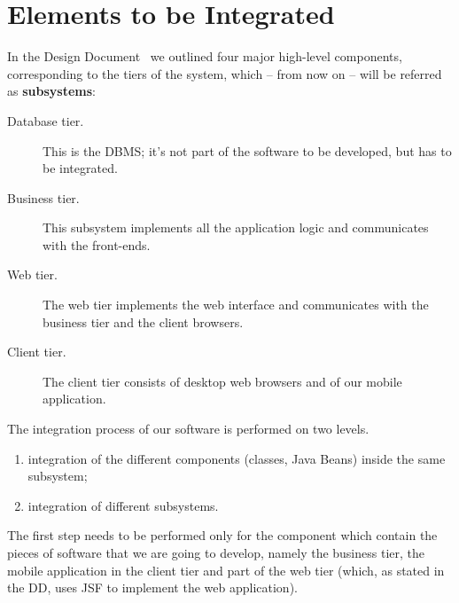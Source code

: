 \section{Elements to be Integrated}
\label{sec:elements}

In the Design Document~\cite[p.~6]{mytaxi-dd} we outlined four major high-level components, corresponding to the tiers of the system, which – from now on – will be referred as \textbf{subsystems}:
\begin{description}
    \item[Database tier.] This is the DBMS; it's not part of the software to be developed, but has to be integrated.
    \item[Business tier.] This subsystem implements all the application logic and communicates with the front-ends.
    \item[Web tier.] The web tier implements the web interface and communicates with the business tier and the client browsers.
    \item[Client tier.] The client tier consists of desktop web browsers and of our mobile application.
\end{description}

The integration process of our software is performed on two levels.
\begin{enumerate}
    \item integration of the different components (classes, Java Beans) inside the same subsystem;
    \item integration of different subsystems.
\end{enumerate}

The first step needs to be performed only for the component which contain the pieces of software that we are going to develop, namely the business tier, the mobile application in the client tier and part of the web tier (which, as stated in the DD, uses JSF to implement the web application).
